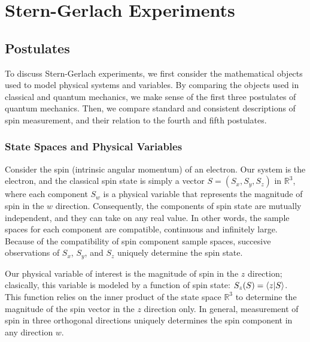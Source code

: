 \usetikzlibrary{shapes.geometric}
\usetikzlibrary{positioning}

\newcommand{\apparatus}[4]{\node[square node] (#1) at (#2,#3){#4};
                           \node[port] (#1+) at (#2 + 0.375, #3 + 0.5){+};
                           \node[port] (#1-) at (#2 + 0.375, #3 - 0.5){-};}

\part{Stern-Gerlach Experiments}

\chapter{Postulates}

To discuss Stern-Gerlach experiments, we first consider the mathematical objects used to model physical systems and variables. By comparing the objects used in classical and quantum mechanics, we make sense of the first three postulates of quantum mechanics. Then, we compare standard and consistent descriptions of spin measurement, and their relation to the fourth and fifth postulates.

\section{State Spaces and Physical Variables}
Consider the spin (intrinsic angular momentum) of an electron. Our system is the electron, and the classical spin state is simply a vector $S = (S_x, S_y, S_z)$ in $\mathbb{R}^3$, where each component $S_w$ is a physical variable that represents the magnitude of spin in the $w$ direction. Consequently, the components of spin state are mutually independent, and they can take on any real value. In other words, the sample spaces for each component are compatible, continuous and infinitely large. Because of the compatibility of spin component sample spaces, succesive observations of $S_x$, $S_y$, and $S_z$ uniquely determine the spin state.

Our physical variable of interest is the magnitude of spin in the $z$ direction; clasically, this variable is modeled by a function of spin state: $S_z(S) = \braket{z|S}$. This function relies on the inner product of the state space $\mathbb{R}^3$ to determine the magnitude of the spin vector in the $z$ direction only. In general, measurement of spin in three orthogonal directions uniquely determines the spin component in any direction $w$.

